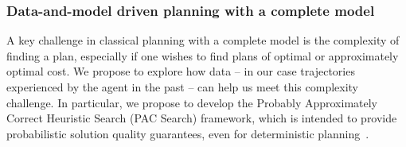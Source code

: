 \documentclass[12pt]{article}
\begin{document}
\subsubsection{Data-and-model driven planning with a complete model}

A key challenge in classical planning with a complete model is the complexity of finding a plan, especially if one wishes to find plans of optimal or approximately optimal cost. We propose to explore how data -- in our case trajectories experienced by the agent in the past -- can help us meet this complexity challenge. %
In particular, we propose to develop the Probably Approximately Correct Heuristic Search (PAC Search) framework, which is intended to provide probabilistic solution quality guarantees, even for deterministic planning~\cite{stern2011probably,stern2012search}. %
\end{document}
